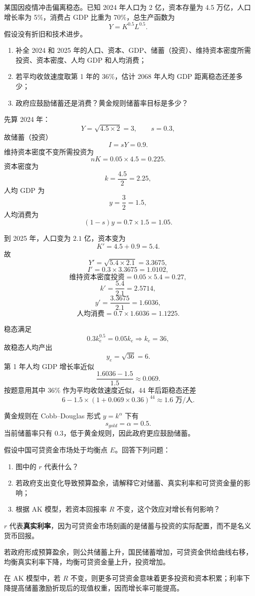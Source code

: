 \begin{question}
某国因疫情冲击偏离稳态。已知 2024 年人口为 2 亿，资本存量为 4.5 万亿，人口增长率为 5\%，消费占 GDP 比重为 70\%，总生产函数为
\[
Y=K^{0.5}L^{0.5}.
\]
假设没有折旧和技术进步。
\begin{enumerate}[label=(\alph*),leftmargin=2.5em]
  \item 补全 2024 和 2025 年的人口、资本、GDP、储蓄（投资）、维持资本密度所需投资、资本密度、人均 GDP 和人均消费；
  \item 若平均收敛速度取第 1 年的 36\%，估计 2068 年人均 GDP 距离稳态还差多少；
  \item 政府应鼓励储蓄还是消费？黄金规则储蓄率目标是多少？
\end{enumerate}
\begin{solution}
先算 2024 年：
\[
Y=\sqrt{4.5\times 2}=3,\qquad s=0.3,
\]
故储蓄（投资）
\[
I=sY=0.9.
\]
维持资本密度不变所需投资为
\[
nK=0.05\times 4.5=0.225.
\]
资本密度为
\[
k=\frac{4.5}{2}=2.25,
\]
人均 GDP 为
\[
y=\frac{3}{2}=1.5,
\]
人均消费为
\[
(1-s)y=0.7\times 1.5=1.05.
\]

到 2025 年，人口变为 $2.1$ 亿，资本变为
\[
K'=4.5+0.9=5.4.
\]
故
\[
Y'=\sqrt{5.4\times 2.1}=3.3675,
\]
\[
I'=0.3\times 3.3675=1.0102,
\]
\[
\text{维持资本密度投资}=0.05\times 5.4=0.27,
\]
\[
k'=\frac{5.4}{2.1}=2.5714,
\]
\[
y'=\frac{3.3675}{2.1}=1.6036,
\]
\[
\text{人均消费}=0.7\times 1.6036=1.1225.
\]

稳态满足
\[
0.3k_e^{0.5}=0.05k_e\Rightarrow k_e=36,
\]
故稳态人均产出
\[
y_e=\sqrt{36}=6.
\]
第 1 年人均 GDP 增长率近似
\[
\frac{1.6036-1.5}{1.5}\approx 0.069.
\]
按题意用其中 36\% 作为平均收敛速度近似，44 年后距稳态还差
\[
6-1.5\times (1+0.069\times 0.36)^{44}\approx 1.6\text{ 万/人}.
\]

黄金规则在 Cobb--Douglas 形式 $y=k^{\alpha}$ 下有
\[
s_{gold}=\alpha=0.5.
\]
当前储蓄率只有 $0.3$，低于黄金规则，因此政府更应鼓励储蓄。\end{solution}
\end{question}

\begin{question}
假设中国可贷资金市场处于均衡点 $E$。回答下列问题：
\begin{enumerate}[label=(\alph*),leftmargin=2.5em]
  \item 图中的 $r$ 代表什么？
  \item 若政府支出变化导致预算盈余，请解释它对储蓄、真实利率和可贷资金量的影响；
  \item 根据 AK 模型，若资本回报率 $R$ 不变，这个效应对增长有何影响？
\end{enumerate}
\begin{solution}
$r$ 代表\textbf{真实利率}，因为可贷资金市场刻画的是储蓄与投资的实际配置，而不是名义货币回报。

若政府形成预算盈余，则公共储蓄上升，国民储蓄增加，可贷资金供给曲线右移，均衡真实利率下降，均衡可贷资金量上升，投资增加。

在 AK 模型中，若 $R$ 不变，则更多可贷资金意味着更多投资和资本积累；利率下降提高储蓄激励折现后的现值权重，因而增长率可能提高。\end{solution}
\end{question}

